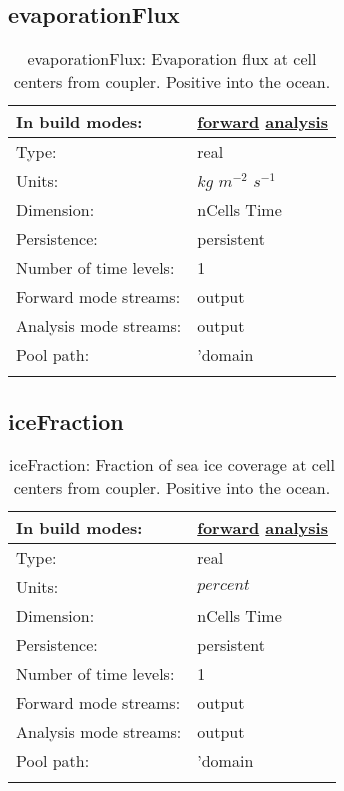 \subsection[evaporationFlux]{evaporationFlux}
\label{subsec:var_sec_forcing_evaporationFlux}
\begin{center}
\begin{longtable}{| p{2.0in} | p{4.0in} |}
        \hline 
        In build modes: & \hyperref[subsec:forward_var_tab_forcing]{forward} \hyperref[subsec:analysis_var_tab_forcing]{analysis} \\
        \hline 
        Type: & real \\
        \hline 
        Units: & $kg$ $m^{-2}$ $s^{-1}$ \\
        \hline 
        Dimension: & nCells Time \\
        \hline 
        Persistence: & persistent \\
        \hline 
        Number of time levels: & 1 \\
        \hline 
		 Forward mode streams: &  output \\
        \hline 
		 Analysis mode streams: &  output \\
        \hline 
            Pool path: & 'domain %
 \\
		 \hline 
    \caption{evaporationFlux: Evaporation flux at cell centers from coupler. Positive into the ocean.}
\end{longtable}
\end{center}
\subsection[iceFraction]{iceFraction}
\label{subsec:var_sec_forcing_iceFraction}
\begin{center}
\begin{longtable}{| p{2.0in} | p{4.0in} |}
        \hline 
        In build modes: & \hyperref[subsec:forward_var_tab_forcing]{forward} \hyperref[subsec:analysis_var_tab_forcing]{analysis} \\
        \hline 
        Type: & real \\
        \hline 
        Units: & $percent$ \\
        \hline 
        Dimension: & nCells Time \\
        \hline 
        Persistence: & persistent \\
        \hline 
        Number of time levels: & 1 \\
        \hline 
		 Forward mode streams: &  output \\
        \hline 
		 Analysis mode streams: &  output \\
        \hline 
            Pool path: & 'domain %
 \\
		 \hline 
    \caption{iceFraction: Fraction of sea ice coverage at cell centers from coupler. Positive into the ocean.}
\end{longtable}
\end{center}
